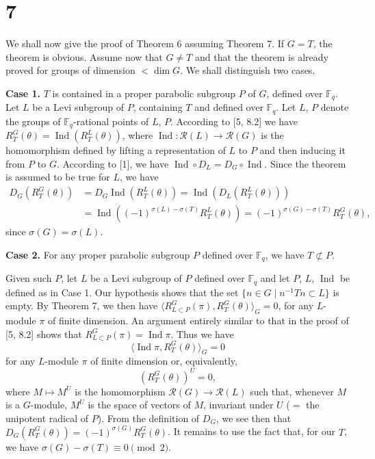 \documentclass[12pt,a4paper]{article}
\theoremstyle{plain}
\theoremstyle{remark}
\DeclareMathOperator{\Ind}{Ind}
\newcommand{\sR}{\mathcal{R}}
\begin{document}
\section*{7}

We shall now give the proof of Theorem 6 assuming Theorem 7. If $G=T$, the theorem is obvious. Assume now that $G \neq T$ and that the theorem is already proved for groups of dimension $< \dim G$. We shall distinguish two cases.

\textbf{Case 1.} $T$ is contained in a proper parabolic subgroup $P$ of $G$, defined over $\mathbb{F}_q$. Let $L$ be a Levi subgroup of $P$, containing $T$ and defined over $\mathbb{F}_q$. Let $L$, $P$ denote the groups of $\mathbb{F}_q$-rational points of $L$, $P$. According to [5, 8.2] we have $R_T^G(\theta) = \Ind(R_T^L(\theta))$, where $\Ind \colon \sR(L) \to \sR(G)$ is the homomorphism defined by lifting a representation of $L$ to $P$ and then inducing it from $P$ to $G$. According to [1], we have $\Ind \circ D_L = D_G \circ \Ind$. Since the theorem is assumed to be true for $L$, we have
\begin{align*}
D_G(R_T^G(\theta)) &= D_G \Ind(R_T^L(\theta)) = \Ind(D_L(R_T^L(\theta))) \\
&= \Ind((-1)^{\sigma(L)-\sigma(T)} R_T^L(\theta)) = (-1)^{\sigma(G)-\sigma(T)} R_T^G(\theta),
\end{align*}
since $\sigma(G) = \sigma(L)$.

\textbf{Case 2.} For any proper parabolic subgroup $P$ defined over $\mathbb{F}_q$, we have $T \not\subset P$.

Given such $P$, let $L$ be a Levi subgroup of $P$ defined over $\mathbb{F}_q$ and let $P$, $L$, $\Ind$ be defined as in Case 1. Our hypothesis shows that the set $\{n \in G \mid n^{-1}Tn \subset L\}$ is empty. By Theorem 7, we then have $\langle R_{L\subset P}^G(\pi), R_T^G(\theta) \rangle_G = 0$, for any $L$-module $\pi$ of finite dimension. An argument entirely similar to that in the proof of [5, 8.2] shows that $R_{L\subset P}^G(\pi) = \Ind \pi$. Thus we have
\begin{equation*}
\langle \Ind \pi, R_T^G(\theta) \rangle_G = 0
\end{equation*}
for any $L$-module $\pi$ of finite dimension or, equivalently,
\begin{equation*}
(R_T^G(\theta))^U = 0,
\end{equation*}
where $M \mapsto M^U$ is the homomorphism $\sR(G) \to \sR(L)$ such that, whenever $M$ is a $G$-module, $M^U$ is the space of vectors of $M$, invariant under $U$ ($=$ the unipotent radical of $P$). From the definition of $D_G$, we see then that $D_G(R_T^G(\theta)) = (-1)^{\sigma(G)} R_T^G(\theta)$. It remains to use the fact that, for our $T$, we have $\sigma(G) - \sigma(T) \equiv 0 \pmod 2$.
\end{document}
